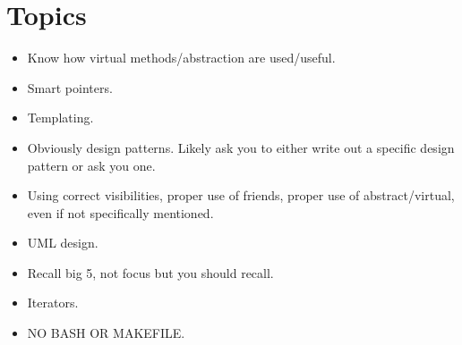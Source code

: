 \documentclass{article}
\author{Clement Tsang}
\begin{document}
\section{Topics}
\begin{itemize}
\item Know how virtual methods/abstraction are used/useful.
\item Smart pointers.
\item Templating.
\item Obviously design patterns.  Likely ask you to either write out a specific design pattern or ask you one.
\item Using correct visibilities, proper use of friends, proper use of abstract/virtual, even if not specifically mentioned.
\item UML design.
\item Recall big 5, not focus but you should recall.
\item Iterators.
\item NO BASH OR MAKEFILE.
\end{itemize}
\end{document}
